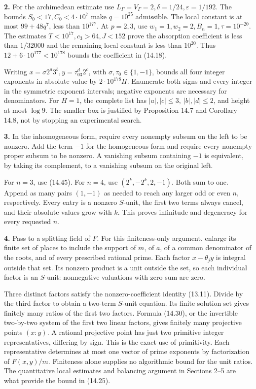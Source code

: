 \documentclass[
  11pt,
  a4paper,
]{article}
\newcounter{none} %
\begin{document}
\textbf{2.} For the archimedean estimate use
\(L_\Gamma=V_\Gamma=2,\delta=1/24,\varepsilon=1/192\). The bounds
\(S_0<17,C_0<4\cdot10^7\) make \(q=10^{25}\) admissible. The local
constant is at most \(99+48q^7\), less than \(10^{177}\). At \(p=2,3\),
use \(w_1=1,w_2=2,B_n=1,\tau=10^{-20}\). The estimates
\(T<10^{17},c_3>64,J<152\) prove the absorption coefficient is less than
\(1/32000\) and the remaining local constant is less than \(10^{20}\).
Thus \(12+6\cdot10^{177}<10^{178}\) bounds the coefficient in (14.18).

Writing \(x=\sigma2^a3^b,y=\tau_03^d2^c\), with
\(\sigma,\tau_0\in\{1,-1\}\), bounds all four integer exponents in
absolute value by \(2\cdot10^{178}H\). Enumerate both signs and every
integer in the symmetric exponent intervals; negative exponents are
necessary for denominators. For \(H=1\), the complete list has
\(|a|,|c|\le3,\ |b|,|d|\le2\), and height at most \(\log9\). The smaller
box is justified by Proposition 14.7 and Corollary 14.8, not by stopping
an experimental search.

\textbf{3.} In the inhomogeneous form, require every nonempty subsum on
the left to be nonzero. Add the term \(-1\) for the homogeneous form and
require every nonempty proper subsum to be nonzero. A vanishing subsum
containing \(-1\) is equivalent, by taking its complement, to a
vanishing subsum on the original left.

For \(n=3\), use (14.45). For \(n=4\), use \((2^k,-2^k,2,-1)\). Both sum
to one. Append as many pairs \((1,-1)\) as needed to reach any larger
odd or even \(n\), respectively. Every entry is a nonzero \(S\)-unit,
the first two terms always cancel, and their absolute values grow with
\(k\). This proves infinitude and degeneracy for every requested \(n\).

\textbf{4.} Pass to a splitting field of \(F\). For this finiteness-only
argument, enlarge its finite set of places to include the support of
\(m\), of \(a\), of a common denominator of the roots, and of every
prescribed rational prime. Each factor \(x-\theta_jy\) is integral
outside that set. Its nonzero product is a unit outside the set, so each
individual factor is an \(S\)-unit: nonnegative valuations with zero sum
are zero.

Three distinct factors satisfy the nonzero-coefficient identity (13.11).
Divide by the third factor to obtain a two-term \(S\)-unit equation. Its
finite solution set gives finitely many ratios of the first two factors.
Formula (14.30), or the invertible two-by-two system of the first two
linear factors, gives finitely many projective points \((x:y)\). A
rational projective point has just two primitive integer
representatives, differing by sign. This is the exact use of
primitivity. Each representative determines at most one vector of prime
exponents by factorization of \(F(x,y)/m\). Finiteness alone supplies no
algorithmic bound for the unit ratios. The quantitative local estimates
and balancing argument in Sections 2--5 are what provide the bound in
(14.25).
\end{document}
